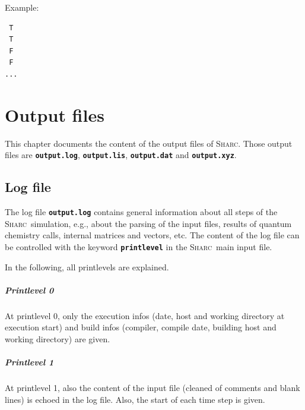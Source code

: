 \documentclass[a4paper,10pt,DIV=15,openany]{scrbook}
\newcommand{\sharc}{\textsc{Sharc}}
\newcommand{\ttt}[1]{\textbf{\texttt{#1}}}
\newenvironment{example}{
  \setlength{\OuterFrameSep}{3pt}
  \vspace{0mm}
  \definecolor{shadecolor}{HTML}{E4F4FF}
  \begin{shaded}
}{
  \end{shaded}
}
\begin{document}
Example:
\begin{example}
\begin{verbatim}
 T
 T
 F
 F
...
\end{verbatim}
\end{example}



\chapter{Output files}\label{chap:output}

This chapter documents the content of the output files of \sharc. Those output files are \ttt{output.log}, \ttt{output.lis}, \ttt{output.dat} and \ttt{output.xyz}.

\section{Log file}\label{sec:logfile}

The log file \ttt{output.log} contains general information about all steps of the \sharc\ simulation, e.g., about the parsing of the input files, results of quantum chemistry calls, internal matrices and vectors, etc. The content of the log file can be controlled with the keyword \ttt{printlevel} in the \sharc\ main input file.

In the following, all printlevels are explained.

\paragraph{Printlevel 0}

At printlevel 0, only the execution infos (date, host and working directory at execution start) and build infos (compiler, compile date, building host and working directory) are given.

\paragraph{Printlevel 1}

At printlevel 1, also the content of the input file (cleaned of comments and blank lines) is echoed in the log file. Also, the start of each time step is given.
\end{document}
